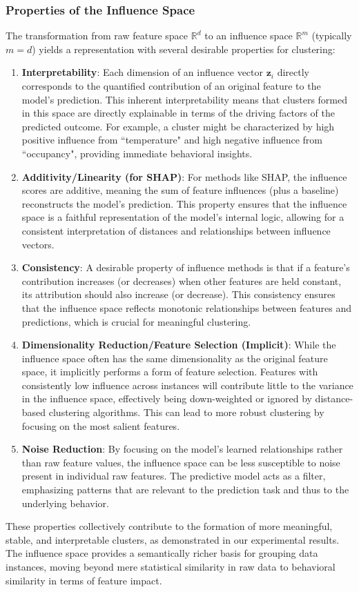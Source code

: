 \documentclass[final,authoryear,3p,times,review,sort&compress]{elsarticle}
\newcommand{\vect}[1]{\mathbf{#1}}
\begin{document}
\subsubsection{Properties of the Influence Space}
\label{sec:influence_space_properties}
The transformation from raw feature space $\mathbb{R}^d$ to an influence space $\mathbb{R}^m$ (typically $m=d$) yields a representation with several desirable properties for clustering:
\begin{enumerate}[label=(\alph*)]
    \item \textbf{Interpretability}: Each dimension of an influence vector $\vect{z}_i$ directly corresponds to the quantified contribution of an original feature to the model's prediction. This inherent interpretability means that clusters formed in this space are directly explainable in terms of the driving factors of the predicted outcome. For example, a cluster might be characterized by high positive influence from ``temperature" and high negative influence from ``occupancy", providing immediate behavioral insights.
    \item \textbf{Additivity/Linearity (for SHAP)}: For methods like SHAP, the influence scores are additive, meaning the sum of feature influences (plus a baseline) reconstructs the model's prediction. This property ensures that the influence space is a faithful representation of the model's internal logic, allowing for a consistent interpretation of distances and relationships between influence vectors.
    \item \textbf{Consistency}: A desirable property of influence methods is that if a feature's contribution increases (or decreases) when other features are held constant, its attribution should also increase (or decrease). This consistency ensures that the influence space reflects monotonic relationships between features and predictions, which is crucial for meaningful clustering.
    \item \textbf{Dimensionality Reduction/Feature Selection (Implicit)}: While the influence space often has the same dimensionality as the original feature space, it implicitly performs a form of feature selection. Features with consistently low influence across instances will contribute little to the variance in the influence space, effectively being down-weighted or ignored by distance-based clustering algorithms. This can lead to more robust clustering by focusing on the most salient features.
    \item \textbf{Noise Reduction}: By focusing on the model's learned relationships rather than raw feature values, the influence space can be less susceptible to noise present in individual raw features. The predictive model acts as a filter, emphasizing patterns that are relevant to the prediction task and thus to the underlying behavior.
\end{enumerate}
These properties collectively contribute to the formation of more meaningful, stable, and interpretable clusters, as demonstrated in our experimental results. The influence space provides a semantically richer basis for grouping data instances, moving beyond mere statistical similarity in raw data to behavioral similarity in terms of feature impact.
\end{document}
